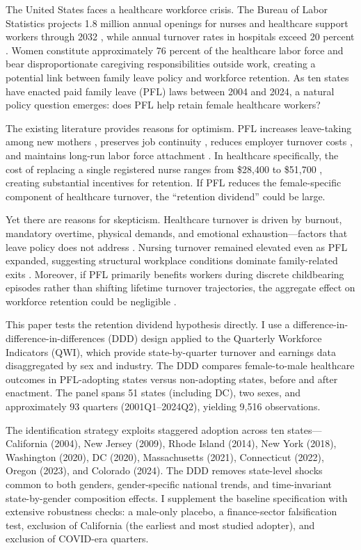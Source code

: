 \documentclass[12pt]{article}
\begin{document}
The United States faces a healthcare workforce crisis. The Bureau of Labor Statistics projects 1.8 million annual openings for nurses and healthcare support workers through 2032 \citep{bls2024}, while annual turnover rates in hospitals exceed 20 percent \citep{nsi2024}. Women constitute approximately 76 percent of the healthcare labor force \citep{acs2023} and bear disproportionate caregiving responsibilities outside work, creating a potential link between family leave policy and workforce retention. As ten states have enacted paid family leave (PFL) laws between 2004 and 2024, a natural policy question emerges: does PFL help retain female healthcare workers?

The existing literature provides reasons for optimism. PFL increases leave-taking among new mothers \citep{rossinslater2013}, preserves job continuity \citep{baum2016}, reduces employer turnover costs \citep{bartel2021}, and maintains long-run labor force attachment \citep{byker2016}. In healthcare specifically, the cost of replacing a single registered nurse ranges from \$28,400 to \$51,700 \citep{nsi2024}, creating substantial incentives for retention. If PFL reduces the female-specific component of healthcare turnover, the ``retention dividend'' could be large.

Yet there are reasons for skepticism. Healthcare turnover is driven by burnout, mandatory overtime, physical demands, and emotional exhaustion---factors that leave policy does not address \citep{shanafelt2017, dyrbye2019}. Nursing turnover remained elevated even as PFL expanded, suggesting structural workplace conditions dominate family-related exits \citep{aiken2002, mchugnursing2011}. Moreover, if PFL primarily benefits workers during discrete childbearing episodes rather than shifting lifetime turnover trajectories, the aggregate effect on workforce retention could be negligible \citep{klerman2012}.

This paper tests the retention dividend hypothesis directly. I use a difference-in-difference-in-differences (DDD) design applied to the Quarterly Workforce Indicators (QWI), which provide state-by-quarter turnover and earnings data disaggregated by sex and industry. The DDD compares female-to-male healthcare outcomes in PFL-adopting states versus non-adopting states, before and after enactment. The panel spans 51 states (including DC), two sexes, and approximately 93 quarters (2001Q1--2024Q2), yielding 9,516 observations.

The identification strategy exploits staggered adoption across ten states---California (2004), New Jersey (2009), Rhode Island (2014), New York (2018), Washington (2020), DC (2020), Massachusetts (2021), Connecticut (2022), Oregon (2023), and Colorado (2024). The DDD removes state-level shocks common to both genders, gender-specific national trends, and time-invariant state-by-gender composition effects. I supplement the baseline specification with extensive robustness checks: a male-only placebo, a finance-sector falsification test, exclusion of California (the earliest and most studied adopter), and exclusion of COVID-era quarters.
\end{document}
